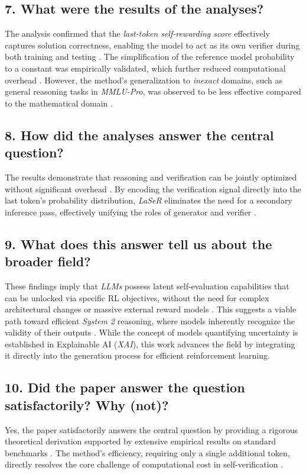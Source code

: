 \documentclass[a4paper,oneside,10pt,ngerman,english]{scrartcl}
\begin{document}
\subsection*{7. What were the results of the analyses?}
The analysis confirmed that the \textit{last-token self-rewarding score} effectively captures solution correctness, enabling the model to act as its own verifier during both training and testing \citep{laser}. The simplification of the reference model probability to a constant was empirically validated, which further reduced computational overhead \citep{laser}. However, the method's generalization to \textit{inexact} domains, such as general reasoning tasks in \textit{MMLU-Pro}, was observed to be less effective compared to the mathematical domain \citep{laser}.

\subsection*{8. How did the analyses answer the central question?}
The results demonstrate that reasoning and verification can be jointly optimized without significant overhead \citep{laser}. By encoding the verification signal directly into the last token's probability distribution, \textit{LaSeR} eliminates the need for a secondary inference pass, effectively unifying the roles of generator and verifier \citep{laser}.

\subsection*{9. What does this answer tell us about the broader field?}
These findings imply that \textit{LLMs} possess latent self-evaluation capabilities that can be unlocked via specific RL objectives, without the need for complex architectural changes or massive external reward models \citep{laser}. This suggests a viable path toward efficient \textit{System 2} reasoning, where models inherently recognize the validity of their outputs \citep{laser}. While the concept of models quantifying uncertainty is established in Explainable AI (\textit{XAI}), this work advances the field by integrating it directly into the generation process for efficient reinforcement learning.

\subsection*{10. Did the paper answer the question satisfactorily? Why (not)?}
Yes, the paper satisfactorily answers the central question by providing a rigorous theoretical derivation supported by extensive empirical results on standard benchmarks \citep{laser}. The method's efficiency, requiring only a single additional token, directly resolves the core challenge of computational cost in self-verification \citep{laser}.
\end{document}

